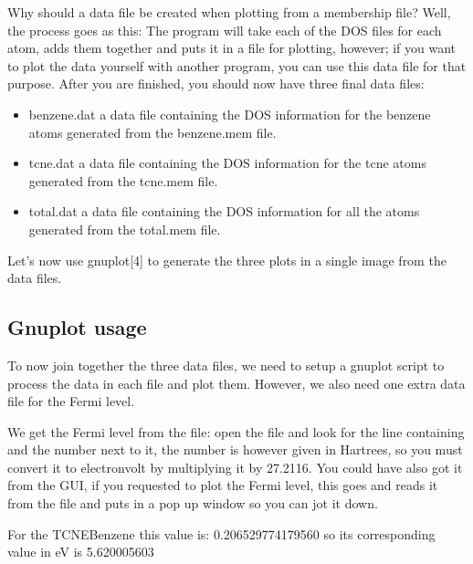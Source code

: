 \documentclass[letterpaper,10pt,english,openany,oneside]{sphinxmanual}
\begin{document}
\sphinxAtStartPar
Why should a data file be created when plotting from a membership file? Well, the process goes as this: The program will take each of the DOS files for each atom, adds them together and puts it in a file for plotting, however; if you want to plot the data yourself with another program, you can use this data file for that purpose.
After you are finished, you should now have three final data files:
\begin{itemize}
\item {} 
\sphinxAtStartPar
benzene.dat a data file containing the DOS information for the benzene atoms generated from the benzene.mem file.

\item {} 
\sphinxAtStartPar
tcne.dat a data file containing the DOS information for the tcne atoms generated from the tcne.mem file.

\item {} 
\sphinxAtStartPar
total.dat a data file containing the DOS information for all the atoms generated from the total.mem file.

\end{itemize}

\sphinxAtStartPar
Let’s now use gnuplot{[}4{]} to generate the three plots in a single image from the data files.


\subsection{Gnuplot usage}
\label{\detokenize{tutorials/ddos/density_of_states:gnuplot-usage}}
\sphinxAtStartPar
To now join together the three data files, we need to setup a gnuplot script to process the data in each file and plot them. However, we also need one extra data file for the Fermi level.

\sphinxAtStartPar
We get the Fermi level from the  file: open the file and look for the line containing  and the number next to it, the number is however given in Hartrees, so you must convert it to electron\sphinxhyphen{}volt by multiplying it by 27.2116. You could have also got it from the GUI, if you requested to plot the Fermi level, this goes and reads it from the file and puts in a pop up window so you can jot it down.

\sphinxAtStartPar
For the TCNE\sphinxhyphen{}Benzene this value is: \sphinxhyphen{}0.206529774179560 so its corresponding value in eV is \sphinxhyphen{}5.620005603
\end{document}
